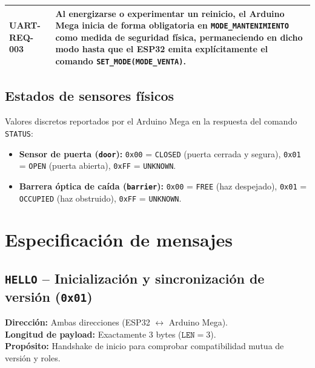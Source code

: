 \documentclass[a4paper,11pt]{article}
\newcommand{\requirement}[2]{%
    \par\smallskip
    \noindent\begin{tabularx}{\textwidth}{|>{\bfseries}p{3.2cm}|X|}
        \hline
        \cellcolor{SAIDLight}#1 & #2 \\
        \hline
    \end{tabularx}
    \par\smallskip
}
\begin{document}
\requirement{UART-REQ-003}{Al energizarse o experimentar un reinicio, el Arduino Mega inicia de forma obligatoria en \texttt{MODE\_MANTENIMIENTO} como medida de seguridad física, permaneciendo en dicho modo hasta que el ESP32 emita explícitamente el comando \texttt{SET\_MODE(MODE\_VENTA)}.}

\subsection{Estados de sensores físicos}

Valores discretos reportados por el Arduino Mega en la respuesta del comando \texttt{STATUS}:
\begin{itemize}[leftmargin=1.6em]
    \item \textbf{Sensor de puerta (\texttt{door}):} \texttt{0x00} = \texttt{CLOSED} (puerta cerrada y segura), \texttt{0x01} = \texttt{OPEN} (puerta abierta), \texttt{0xFF} = \texttt{UNKNOWN}.
    \item \textbf{Barrera óptica de caída (\texttt{barrier}):} \texttt{0x00} = \texttt{FREE} (haz despejado), \texttt{0x01} = \texttt{OCCUPIED} (haz obstruido), \texttt{0xFF} = \texttt{UNKNOWN}.
\end{itemize}



\section{Especificación de mensajes}

\subsection{\texttt{HELLO} -- Inicialización y sincronización de versión (\texttt{0x01})}

\noindent
\textbf{Dirección:} Ambas direcciones (ESP32 $\leftrightarrow$ Arduino Mega).\\
\textbf{Longitud de payload:} Exactamente 3 bytes ($\texttt{LEN} = 3$).\\
\textbf{Propósito:} Handshake de inicio para comprobar compatibilidad mutua de versión y roles.
\end{document}
